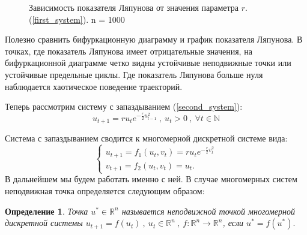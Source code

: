 \documentclass[10pt]{article}
\newtheorem{definition}{Определение}
\numberwithin{equation}{section}
\begin{document}
\begin{figure}[h]
	\caption{Зависимость показателя Ляпунова от значения параметра \( r \). (\ref{first_system}). n = 1000}
\end{figure}

Полезно сравнить бифуркационную диаграмму и график показателя Ляпунова. В точках, где показатель Ляпунова имеет отрицательные значения, на бифуркационной диаграмме четко видны устойчивые неподвижные точки или устойчивые предельные циклы. Где показатель Ляпунова больше нуля наблюдается хаотическое поведение траекторий.

Теперь рассмотрим систему с запаздыванием (\ref{second_system}):
\[ u_{t+1} = ru_te^{-\frac{r}{2}u_{t-1}^2} \ , \ u_t> 0 \ , \ \forall t \in \mathbb{N} \]

\noindent Система с запаздыванием сводится к многомерной дискретной системе вида:
\begin{equation}\label{multidimensional_system}
	\begin{cases}
		u_{t+1} = f_1(u_t, v_t) = ru_te^{-\frac{r}{2}v_t^2} \\
		v_{t+1} = f_2(u_t, v_t) = u_t.
	\end{cases}
\end{equation}
В дальнейшем мы будем работать именно с ней.
В случае многомерных систем неподвижная точка определяется следующим образом:
\begin{definition}
	Точка \( u^* \in \mathbb{R}^n\) называется неподвижной точкой многомерной дискретной системы \( u_{t+1} = f(u_t) \ , \ u_t \in \mathbb{R}^n \ , \ f:\mathbb{R}^n \to \mathbb{R}^n\), если \(u^* = f(u^*).\)
\end{definition}
\end{document}
